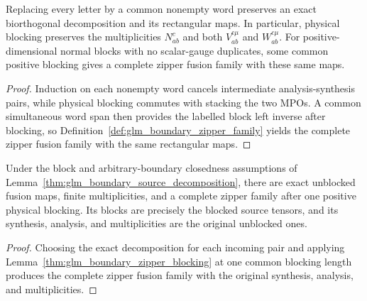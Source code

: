 \begin{lemma}
    \leanok
    \label{thm:glm_boundary_zipper_blocking}
    Replacing every letter by a common nonempty word preserves an exact
    biorthogonal decomposition and its rectangular maps. In particular,
    physical blocking preserves the multiplicities $N_{ab}^c$ and both
    $V_{ab}^{c\mu}$ and $W_{ab}^{c\mu}$. For positive-dimensional normal
    blocks with no scalar-gauge duplicates, some common positive blocking
    gives a complete zipper fusion family with these same maps.
\end{lemma}
\begin{proof}
    \leanok
    Induction on each nonempty word cancels intermediate analysis-synthesis
    pairs, while physical blocking commutes with stacking the two MPOs.
    A common simultaneous word span then provides the labelled block left
    inverse after blocking, so Definition~\ref{def:glm_boundary_zipper_family}
    yields the complete zipper fusion family with the same rectangular maps.
\end{proof}

\begin{lemma}
    \leanok
    \label{thm:glm_boundary_complete_family}
    Under the block and arbitrary-boundary closedness assumptions of
    Lemma~\ref{thm:glm_boundary_source_decomposition}, there are exact
    unblocked fusion maps, finite multiplicities, and a complete zipper
    family after one positive physical blocking. Its blocks are precisely
    the blocked source tensors, and its synthesis, analysis, and
    multiplicities are the original unblocked ones.
\end{lemma}
\begin{proof}
    \leanok
    Choosing the exact decomposition for each incoming pair and applying
    Lemma~\ref{thm:glm_boundary_zipper_blocking} at one common blocking
    length produces the complete zipper fusion family with the original
    synthesis, analysis, and multiplicities.
\end{proof}

